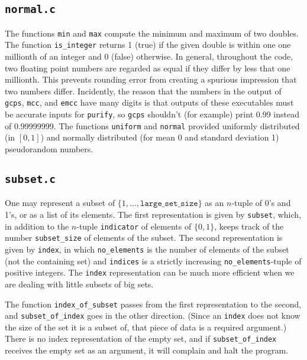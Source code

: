 \documentclass[12pt]{article}
\theoremstyle{definition}
\begin{document}
\begin{appendix}
\subsection{\texttt{normal.c}}

The functions \texttt{min} and \texttt{max} compute the minimum and
maximum of two doubles.  The function \texttt{is\_integer} returns 1
(true) if the given double is within one one millionth of an integer
and 0 (false) otherwise.  In general, throughout the code, two
floating point numbers are regarded as equal if they differ by less
that one millionth.  This prevents rounding error from creating a
spurious impression that two numbers differ.  Incidently, the reason
that the numbers in the output of \texttt{gcps}, \texttt{mcc}, and
\texttt{emcc} have many digits is that outputs of these executables
must be accurate inputs for \texttt{purify}, so \texttt{gcps}
shouldn't (for example) print 0.99 instead of 0.99999999. The
functions \texttt{uniform} and \texttt{normal} provided uniformly
distributed (in $[0,1]$) and normally distributed (for mean 0 and
standard deviation 1) pseudorandom numbers.

\subsection{\texttt{subset.c}}

One may represent a subset of $\{1, \ldots,
\mathtt{large\_set\_size}\}$ as an $n$-tuple of 0's and 1's, or as a
list of its elements.  The first representation is given by
\texttt{subset}, which, in addition to the $n$-tuple
\texttt{indicator} of elements of $\{0,1\}$, keeps track of the number
\texttt{subset\_size} of elements of the subset.  The second
representation is given by \texttt{index}, in which
\texttt{no\_elements} is the number of elements of the subset (not the
containing set) and \texttt{indices} is a strictly increasing
\texttt{no\_elements}-tuple of positive integers.  The \texttt{index}
representation can be much more efficient when we are dealing with
little subsets of big sets.

The function \texttt{index\_of\_subset} passes from the first
representation to the second, and \texttt{subset\_of\_index} goes in
the other direction.  (Since an \texttt{index} does not know the size
of the set it is a subset of, that piece of data is a required
argument.) There is no index representation of the empty set, and if
\texttt{subset\_of\_index} receives the empty set as an argument, it
will complain and halt the program.


\end{appendix}
\end{document}
